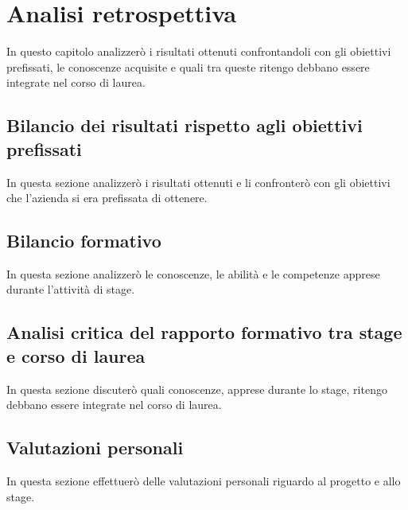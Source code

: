 \newpage
\chapter{Analisi retrospettiva}
\label{cap:analisiretrospettiva}

In questo capitolo analizzerò i risultati ottenuti confrontandoli con gli obiettivi prefissati, le conoscenze acquisite e quali tra queste ritengo debbano essere integrate nel corso di laurea.

\section{Bilancio dei risultati rispetto agli obiettivi prefissati}

In questa sezione analizzerò i risultati ottenuti e li confronterò con gli obiettivi che l'azienda si era prefissata di ottenere.

\section{Bilancio formativo}

In questa sezione analizzerò le conoscenze, le abilità e le competenze apprese durante l'attività di stage.

\section{Analisi critica del rapporto formativo tra stage e corso di laurea}

In questa sezione discuterò quali conoscenze, apprese durante lo stage, ritengo debbano essere integrate nel corso di laurea.

\section{Valutazioni personali}

In questa sezione effettuerò delle valutazioni personali riguardo al progetto e allo stage.